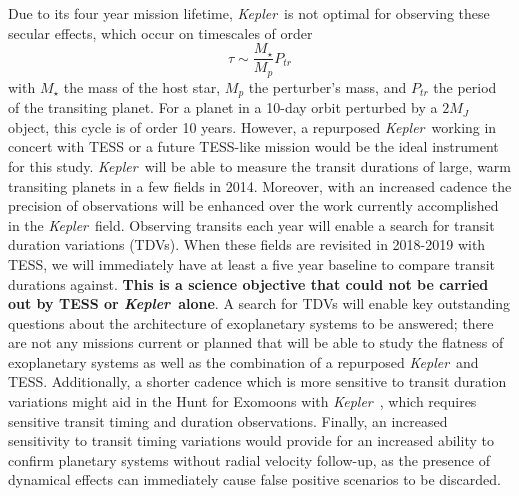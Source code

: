 \documentclass[12pt, preprint]{aastex}
\newcommand{\observatory}[1]{\textsl{#1}}
\newcommand{\kepler}{\observatory{Kepler}}
\newcommand{\Kepler}{\kepler}
\begin{document}
Due to its four year mission lifetime, \Kepler\ is not optimal for observing 
 these secular effects, which occur on timescales of order
\begin{equation}
\tau \sim \frac{M_\star}{M_p}P_{tr}
\end{equation}
with $M_\star$ the mass of the host star, $M_p$ the perturber's mass, and
 $P_{tr}$ the period of the transiting planet. 
For a planet in a 10-day orbit perturbed by a $2 M_J$ object, this cycle is 
 of order 10 years. 
 However, a repurposed \Kepler\ working in concert with
 TESS or a future TESS-like mission would be the ideal instrument for this 
 study. 
\Kepler\ will be able to measure the transit durations of large, warm 
 transiting planets in a few fields in 2014. 
Moreover, with an increased cadence the precision of observations will be 
 enhanced over the work currently accomplished in the \Kepler\ field. 
Observing transits each year will enable a search for transit duration 
 variations (TDVs). 
When these fields are revisited in 2018-2019 with TESS, we will immediately have
 at least a five year baseline to compare transit durations against. 
\textbf{This is a science objective that could not be carried out by TESS or 
 \Kepler\ alone}. 
A search for TDVs will enable key outstanding questions about the architecture
 of exoplanetary systems to be answered;  there are not any missions current or
 planned that will be able to study the flatness of exoplanetary systems as 
 well as the combination of a repurposed \Kepler\ and TESS. 
Additionally, a shorter cadence which is more sensitive to transit duration 
 variations might aid in the Hunt for Exomoons with \Kepler\
 \citep{Kipping12}, which requires sensitive transit timing and duration 
 observations.
Finally, an increased sensitivity to transit timing variations would provide 
 for an increased ability to confirm planetary systems without radial velocity 
 follow-up, as the presence of dynamical effects can immediately cause false 
 positive scenarios to be discarded.
 
\end{document}
